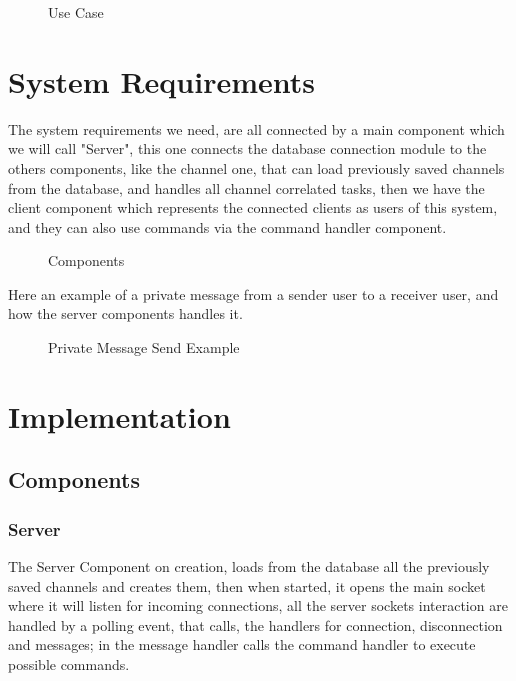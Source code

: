 \documentclass{article}
\begin{document}
\begin{figure}[ht]
    \centering
    
    \caption{Use Case}
    \label{fig:use_case.svg}
\end{figure}


\newpage



\section{System Requirements}
The system requirements we need, are all connected by a main component which we will call "Server", this one connects the database connection module to the others components, like the channel one, that can load previously saved channels from the database, and handles all channel correlated tasks, then we have the client component which represents the connected clients as users of this system, and they can also use commands via the command handler component.

\begin{figure}[ht]
    \centering
    
    \caption{Components}
    \label{fig:components.svg}
\end{figure}

\vspace{12pt}
\vspace{12pt}
\vspace{12pt}

Here an example of a private message from a sender user to a receiver user, and how the server components handles it.
\vspace{12pt}

\begin{figure}[ht]
    \centering
    
    \caption{Private Message Send Example}
    \label{fig:message.svg}
\end{figure}


\newpage



\section{Implementation}

\subsection{Components}

\subsubsection{Server}
The Server Component on creation, loads from the database all the previously saved channels and creates them, then when started, it opens the main socket where it will listen for incoming connections, all the server sockets interaction are handled by a polling event, that calls, the handlers for connection, disconnection and messages;
in the message handler calls the command handler to execute possible commands.
\end{document}
